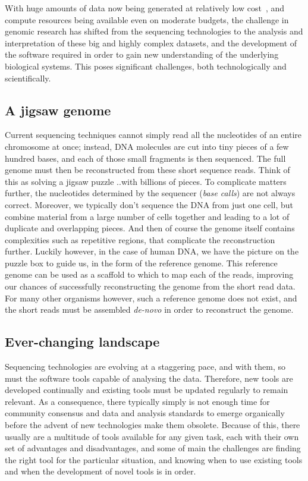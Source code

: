 \begin{justify}
With huge amounts of data now being generated at relatively low cost~\cite{chen2014big}, and compute resources being available even on moderate budgets, the challenge in genomic research has shifted from the sequencing technologies to the analysis and interpretation of these big and highly complex datasets, and the development of the software required in order to gain new understanding of the underlying biological systems. This poses significant challenges, both technologically and scientifically.


\subsection{A jigsaw genome}
Current sequencing techniques cannot simply read all the nucleotides of an entire chromosome at once; instead, DNA molecules are cut into tiny pieces of a few hundred bases, and each of those small fragments is then sequenced. The full genome must then be reconstructed from these short sequence reads. Think of this as solving a jigsaw puzzle ..with billions of pieces. To complicate matters further, the nucleotides determined by the sequencer (\emph{base calls}) are not always correct. Moreover, we typically don't sequence the DNA from just one cell, but combine material from a large number of cells together and leading to a lot of duplicate and overlapping pieces. And then of course the genome itself contains complexities such as repetitive regions, that complicate the reconstruction further. Luckily however, in the case of human DNA, we have the picture on the puzzle box to guide us, in the form of the reference genome. This reference genome can be used as a scaffold to which to map each of the reads, improving our chances of successfully reconstructing the genome from the short read data. For many other organisms however, such a reference genome does not exist, and the short reads must be assembled \emph{de-novo} in order to reconstruct the genome.

\subsection{Ever-changing landscape}
Sequencing technologies are evolving at a staggering pace, and with them, so must the software tools capable of analysing the data. Therefore, new tools are developed continually and existing tools must be updated regularly to remain relevant. As a consequence, there typically simply is not enough time for community consensus and data and analysis standards to emerge organically before the advent of new technologies make them obsolete. Because of this, there usually are a multitude of tools available for any given task, each with their own set of advantages and disadvantages, and some of main the challenges are finding the right tool for the particular situation, and knowing when to use existing tools and when the development of novel tools is in order.



\end{justify}

